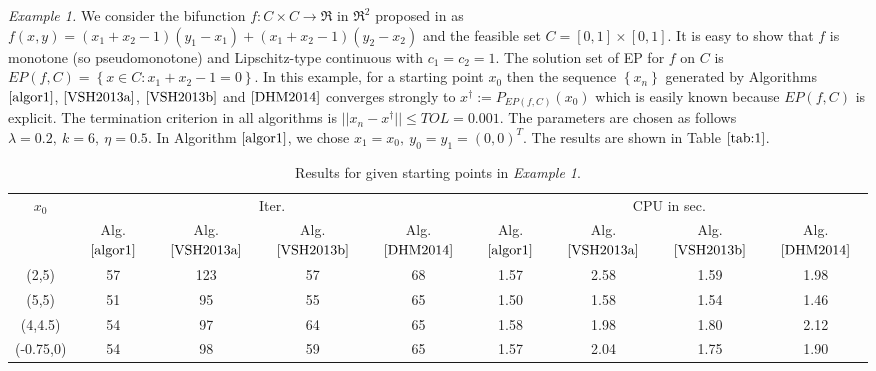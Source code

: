 \documentclass{aims}
\theoremstyle{definition}
\begin{document}
\textit{Example 1.} We consider the bifunction $f:C\times C\to \Re$ in $\Re^{2}$ proposed in \cite[Example 3]{MPPP2012} as 
$f(x,y)=(x_1+x_2-1)(y_1-x_1)+(x_1+x_2-1)(y_2-x_2)$ and the feasible set $C=[0,1]\times[0,1]$. It is easy to show that $f$ 
is monotone (so pseudomonotone) and Lipschitz-type continuous with $c_1=c_2=1$. The solution set of EP for $f$ on $C$ is 
$EP(f,C)=\left\{x\in C:x_1+x_2-1=0\right\}$. 
In this example, for a starting point $x_0$ then the sequence $\left\{x_n\right\}$ generated by Algorithms 
$\ref{algor1}$, $\ref{VSH2013a}$, $\ref{VSH2013b}$ and $\ref{DHM2014}$ converges strongly to 
$x^\dagger:=P_{EP(f,C)}(x_0)$ which is easily known because $EP(f,C)$ is explicit. The termination criterion in all algorithms 
is $||x_n-x^\dagger||\le TOL=0.001$.
The parameters are chosen as follows $\lambda=0.2,~k=6,~\eta=0.5$. In Algorithm $\ref{algor1}$, we chose 
$x_1=x_0,~y_0=y_1=(0,0)^T$. The results are shown in Table $\ref{tab:1}$.

\begin{table}[ht]\caption{Results for given starting points in \textit{Example 1}.}\label{tab:1}
\medskip\begin{center}
\begin{tabular}{|c|c|c|c|c|c|c|c|c|}
\hline
 $x_0$& \multicolumn{4}{c|}{Iter.} &\multicolumn{4}{c|}{CPU in sec.}
\\ \cline{2-9}
  & Alg. $\ref{algor1}$ &Alg. $\ref{VSH2013a}$&Alg. $\ref{VSH2013b}$&Alg. $\ref{DHM2014}$& Alg. $\ref{algor1}$ &Alg. $\ref{VSH2013a}$&Alg. $\ref{VSH2013b}$&Alg. $\ref{DHM2014}$ \\ \hline
(2,5)&57&123&57&68&1.57 &2.58&1.59&1.98 \\ \hline
(5,5)&51&95&55&65& 1.50&1.58&1.54&1.46 \\ \hline
(4,4.5)&54&97&64&65& 1.58&1.98&1.80&2.12 \\ \hline
(-0.75,0)&54&98&59&65& 1.57&2.04&1.75&1.90 \\ \hline
 \end{tabular}
\end{center}
\end{table}
\end{document}
